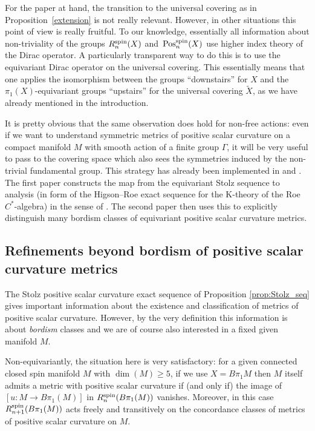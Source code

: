	\begin{Remark}
		For the paper at hand, the transition to the universal covering as in
		Proposition~\ref{extension} is not really relevant. However, in other
		situations this point of view is really fruitful. To our knowledge,
		essentially all information about non-triviality of the groups
		$R^{\rm spin}_n(X)$ and~$\mathrm{Pos}_n^{\rm spin}(X)$ use higher index theory of the Dirac
		operator. A particularly transparent way to do this is to use the
		equivariant Dirac operator on the universal covering. This essentially means
		that one applies the isomorphism between the groups ``downstairs'' for $X$ and the
		$\pi_1(X)$-equivariant groups ``upstairs'' for the universal covering
		$\tilde X$, as we have already mentioned in the introduction.
		
		It
		is pretty obvious that the same observation does hold for non-free actions: even
		if we want to understand symmetric metrics of positive scalar curvature on a
		compact manifold $M$ with smooth action of a finite group $\Gamma$, it will
		be very useful to pass to the covering space which also sees the symmetries
		induced by the non-trivial fundamental group. This strategy has already been
		implemented in \cite[Section 5]{XieYu}
		and \cite{XieYuZeidler}. The first paper constructs the map from the
		equivariant
		Stolz sequence to analysis (in form of the Higson--Roe exact sequence for the
		K-theory of the Roe $C^*$-algebra) in the
		sense of \cite{PiazzaSchick}. The second paper then uses this to explicitly
		distinguish many bordism classes of equivariant positive scalar curvature
		metrics.
	\end{Remark}
	
	
	\subsection{Refinements beyond bordism of positive scalar curvature metrics}
	
	The Stolz positive scalar curvature exact sequence of Proposition
	\ref{prop:Stolz_seq} gives important information about the existence and
	classification of metrics of positive scalar curvature. However, by the very
	definition this information is about \emph{bordism} classes and we are of
	course also interested in a fixed given manifold $M$.
	
	Non-equivariantly, the situation here is very satisfactory: for a given
	connected closed spin manifold $M$ with $\dim(M)\ge 5$, if we use $X=B\pi_1M$
	then $M$ itself admits a metric with positive scalar curvature if (and only
	if) the image of $[u\colon M\to B\pi_1(M)]$ in $R_n^{\rm spin}(B\pi_1(M))$
	vanishes. Moreover, in this case $R_{n+1}^{\rm spin}(B\pi_1(M))$ acts freely and
	transitively on the concordance classes of metrics of positive scalar
	curvature on $M$.
	
